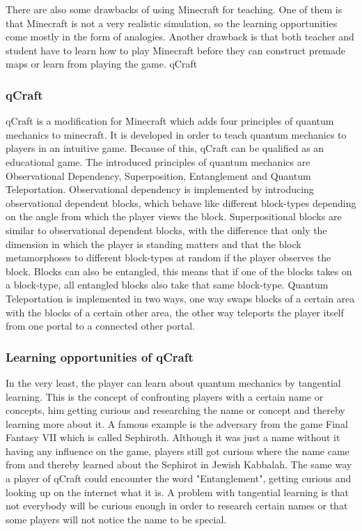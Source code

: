 \documentclass[12pt]{report} %
\begin{document}
There are also some drawbacks of using Minecraft for teaching. One of them is that Minecraft is not a very realistic simulation, so the learning opportunities come mostly in the form of analogies. Another drawback is that both teacher and student have to learn how to play Minecraft before they can construct premade maps or learn from playing the game.
qCraft

\subsubsection{qCraft}

qCraft is a modification for Minecraft which adds four principles of quantum mechanics to minecraft. It is developed in order to teach quantum mechanics to players in an intuitive game. Because of this, qCraft can be qualified as an educational game. The introduced principles of quantum mechanics are Observational Dependency, Superposition, Entanglement and Quantum Teleportation. Observational dependency is implemented by introducing observational dependent blocks, which behave like different block-types depending on the angle from which the player views the block. Superpositional blocks are similar to observational dependent blocks, with the difference that only the dimension in which the player is standing matters and that the block metamorphoses to different block-types at random if the player observes the block. Blocks can also be entangled, this means that if one of the blocks takes on a block-type, all entangled blocks also take that same block-type. Quantum Teleportation is implemented in two ways, one way swaps blocks of a certain area with the blocks of a certain other area, the other way teleports the player itself from one portal to a connected other portal.

\subsubsection{Learning opportunities of qCraft}

In the very least, the player can learn about quantum mechanics by tangential learning. This is the concept of confronting players with a certain name or concepts, him getting curious and researching the name or concept and thereby learning more about it. A famous example is the adversary from the game Final Fantasy VII which is called Sephiroth. Although it was just a name without it having any influence on the game, players still got curious where the name came from and thereby learned about the Sephirot in Jewish Kabbalah. The same way a player of qCraft could encounter the word "Entanglement", getting curious and looking up on the internet what it is. A problem with tangential learning is that not everybody will be curious enough in order to research certain names or that some players will not notice the name to be special.
\end{document}

